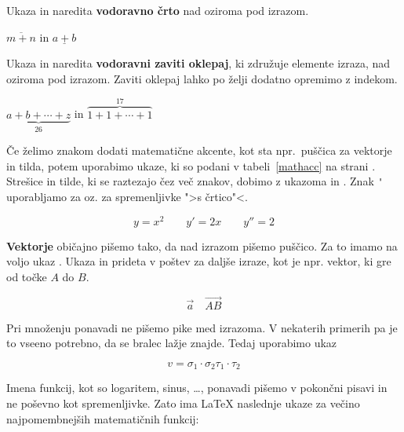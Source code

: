 Ukaza  in  naredita \textbf{vodoravno črto} nad oziroma pod izrazom.
\begin{example}
$\overline{m+n}$ in 
$\underline{a+b}$
\end{example}

Ukaza  in  naredita \textbf{vodoravni zaviti oklepaj}, ki združuje elemente izraza,
nad oziroma pod izrazom. Zaviti oklepaj lahko po želji dodatno opremimo z indekom.
\begin{example}
$\underbrace{ a+b+\cdots+z }_{26}$ 
in 
$\overbrace{ 1+1+\cdots+1 }^{17}$
\end{example}

 Če želimo znakom dodati matematične akcente, kot 
sta npr.~puščica za vektorje in tilda, potem uporabimo ukaze, ki
so podani v tabeli~\ref{mathacc} na strani \pageref{mathacc}. Strešice in tilde, ki se raztezajo čez več znakov, 
dobimo z ukazoma  in . Znak \verb|'| uporabljamo za
 oz. za spremenljivke ">s črtico"<.
\begin{example}
\begin{displaymath}
y=x^{2}\qquad y'=2x\qquad y''=2
\end{displaymath}
\end{example}

\textbf{Vektorje} običajno pišemo tako, da nad izrazom pišemo puščico.
Za to imamo na voljo ukaz . Ukaza  in
 prideta v poštev za daljše izraze, kot je npr. vektor, ki gre od točke $A$ do $B$.
\begin{example}
\begin{displaymath}
\vec a\quad\overrightarrow{AB}
\end{displaymath}
\end{example}


Pri množenju ponavadi ne pišemo pike med izrazoma. V nekaterih primerih pa je 
to vseeno potrebno, da se bralec lažje znajde. Tedaj uporabimo ukaz 
\begin{example}
\begin{displaymath}
v = {\sigma}_1 \cdot {\sigma}_2
    {\tau}_1 \cdot {\tau}_2
\end{displaymath}
\end{example}


Imena funkcij, kot so logaritem, sinus, \ldots, ponavadi pišemo v pokončni pisavi in ne poševno kot 
spremenljivke. Zato ima \LaTeX{} naslednje ukaze za večino najpomembnejših matematičnih funkcij:
\vspace{1em}

